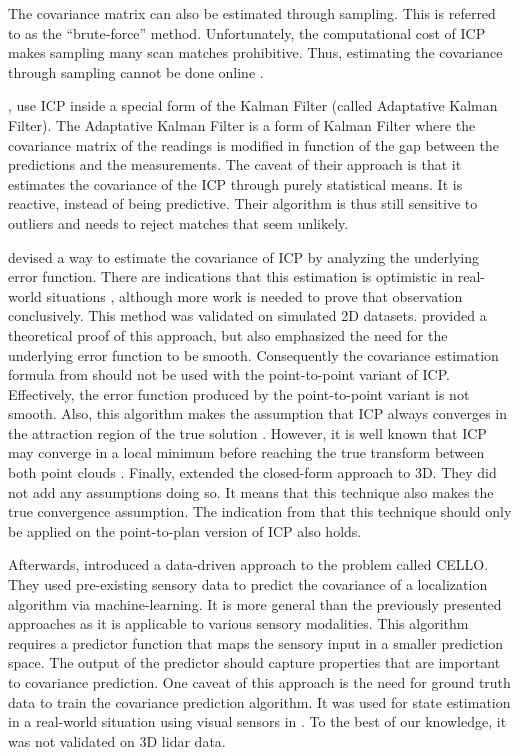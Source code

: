 \documentclass[10pt,letterpaper,oneside]{article}
\begin{document}
The covariance matrix can also be estimated through sampling.
This is referred to as the \enquote{brute-force} method.
Unfortunately, the computational cost of \ac{ICP} makes sampling many scan matches prohibitive.
Thus, estimating the covariance through sampling cannot be done online \cite{Censi2007}.

\citet{Mehra1970}, \citet{Aghili2016} use \ac{ICP} inside a special form of the Kalman Filter (called Adaptative Kalman Filter).
The Adaptative Kalman Filter is a form of Kalman Filter where the covariance matrix of the readings is modified in function of the gap between the predictions and the measurements.
The caveat of their approach is that it estimates the covariance of the \ac{ICP} through purely statistical means.
It is reactive, instead of being predictive.
Their algorithm is thus still sensitive to outliers and needs to reject matches that seem unlikely.

\citet{Censi2007} devised a way to estimate the covariance of \ac{ICP} by analyzing the underlying error function.
There are indications that this estimation is optimistic in real-world situations \cite{VegaBrown2013em}, although more work is needed to prove that observation conclusively.
This method was validated on simulated 2D datasets.
\citet{Bonnabel2016} provided a theoretical proof of this approach, but also emphasized the need for the underlying error function to be smooth.
Consequently the covariance estimation formula from \cite{Censi2007} should not be used with the point-to-point variant of \ac{ICP}. 
Effectively, the error function produced by the point-to-point variant is not smooth.
Also, this algorithm makes the assumption that \ac{ICP} always converges in the attraction region of the true solution \cite{Censi2007}.
However, it is well known that \ac{ICP} may converge in a local minimum before reaching the true transform between both point clouds \cite{Bonnabel2016}.
Finally, \citet{Manoj2015} extended the closed-form approach to 3D.
They did not add any assumptions doing so.
It means that this technique also makes the true convergence assumption.
The indication from \citet{Bonnabel2016} that this technique should only be applied on the point-to-plan version of \ac{ICP} also holds.

Afterwards, \citet{VegaBrown2013} introduced a data-driven approach to the problem called \ac{CELLO}.
They used pre-existing sensory data to predict the covariance of a localization algorithm via machine-learning.
It is more general than the previously presented approaches as it is applicable to various sensory modalities.
This algorithm requires a predictor function that maps the sensory input in a smaller prediction space.
The output of the predictor should capture properties that are important to covariance prediction.
One caveat of this approach is the need for ground truth data to train the covariance prediction algorithm.
It was used for state estimation in a real-world situation using visual sensors in \cite{Peretroukhin2015}.
To the best of our knowledge, it was not validated on 3D lidar data.
\end{document}
